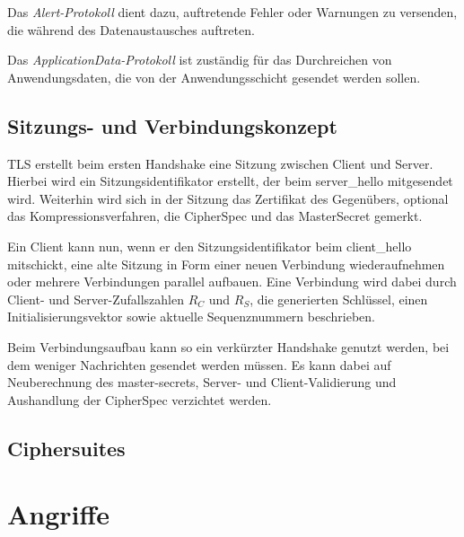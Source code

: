 \documentclass[
    12pt,
    headings=small,
    parskip=half,           %
    bibliography=totoc,
    numbers=noenddot,       %
    open=any,               %
    ]{scrreprt}
\begin{document}
Das \emph{Alert-Protokoll} dient dazu, auftretende Fehler oder Warnungen zu versenden, die während des Datenaustausches auftreten. 

Das \emph{ApplicationData-Protokoll} ist zuständig für das Durchreichen von Anwendungsdaten, die von der Anwendungsschicht gesendet werden sollen.\cite{Schneier2006}

\section{Sitzungs- und Verbindungskonzept}

TLS erstellt beim ersten Handshake eine Sitzung zwischen Client und Server. Hierbei wird ein Sitzungsidentifikator erstellt, der beim server\_hello mitgesendet wird. Weiterhin wird sich in der Sitzung das Zertifikat des Gegenübers, optional das Kompressionsverfahren, die CipherSpec und das MasterSecret gemerkt.

Ein Client kann nun, wenn er den Sitzungsidentifikator beim client\_hello mitschickt, eine alte Sitzung in Form einer neuen Verbindung wiederaufnehmen oder mehrere Verbindungen parallel aufbauen. Eine Verbindung wird dabei durch Client- und Server-Zufallszahlen \(R_C\) und \(R_S\), die generierten Schlüssel, einen Initialisierungsvektor  sowie aktuelle Sequenznummern beschrieben.

Beim Verbindungsaufbau kann so ein verkürzter Handshake genutzt werden, bei dem weniger Nachrichten gesendet werden müssen. Es kann dabei auf Neuberechnung des master-secrets, Server- und Client-Validierung und Aushandlung der CipherSpec verzichtet werden.

\section{Ciphersuites}



\chapter{Angriffe}

\section{}



\end{document}
